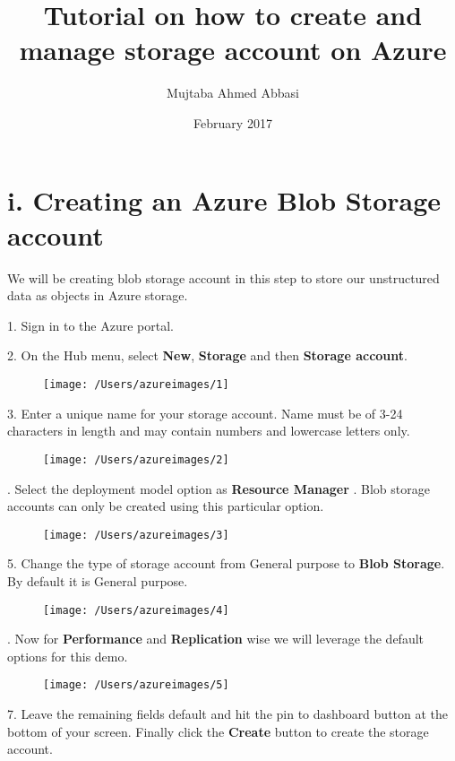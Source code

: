 \documentclass[12pt, letterpaper, twoside]{article}
\title{\textbf{Tutorial on how to create and manage storage account on Azure}}
\author{Mujtaba Ahmed Abbasi}
\date{February 2017}
\begin{document}
	
	\begin{titlepage}
		\clearpage\maketitle
		\thispagestyle{empty}
	\end{titlepage}
	
\setcounter{page}{1}
	
\section*{i. Creating an Azure Blob Storage account}	
We will be creating blob storage account in this step to store our unstructured data as objects in Azure storage. \par
\vspace{0.5cm}
1. Sign in to the Azure portal. \par
\vspace{0.5cm}
2. On the Hub menu, select \textbf{New}, \textbf{Storage} and then \textbf{Storage account}.
\begin{figure}[H]
	\centering
	\texttt{[image: /Users/azureimages/1]}
\end{figure}
3. Enter a unique name for your storage account. Name must be of 3-24 \indent characters in length and may contain numbers and lowercase letters only. 
\begin{figure}[H]
	\centering
	\texttt{[image: /Users/azureimages/2]}
\end{figure}
. Select the deployment model option as \textbf{Resource Manager} . Blob \indent storage accounts can only be created using this particular option. 
\begin{figure}[H]
	\centering
	\texttt{[image: /Users/azureimages/3]}
\end{figure}
5. Change the type of storage account from General purpose to \textbf{Blob \indent Storage}. By default it is General purpose.
\begin{figure}[H]
	\centering
	\texttt{[image: /Users/azureimages/4]}
\end{figure}
. Now for \textbf{Performance} and \textbf{Replication} wise we will leverage the \indent default options for this demo.
\begin{figure}[H]
	\centering
	\texttt{[image: /Users/azureimages/5]}
\end{figure}
7. Leave the remaining fields default and hit the pin to dashboard button \indent at the bottom of your screen. Finally click the \textbf{Create} button to create \indent the storage account.  
\clearpage
\end{document}

